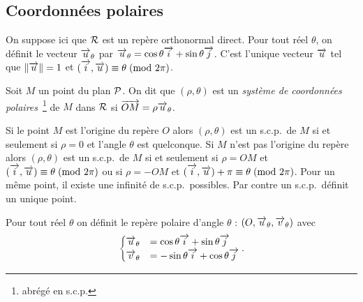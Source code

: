 \subsection{Coordonnées polaires}
\label{subsec:coordpol}
  On suppose ici que \(\Rep\) est un repère orthonormal direct. Pour tout réel \(\theta\), on définit le vecteur \(\vu_\theta\) par \(\vu_\theta=\cos\theta\vi+\sin\theta\vj\). C'est l'unique vecteur \(\vu\) tel que \(\norme{\vu}=1\) et \(\congru{(\vi,\vu)}{\theta}{2\pi}\).
\begin{defdef}
  Soit \(M\) un point du plan \(\P\). On dit que \((\rho,\theta)\) est un \emph{système de coordonnées polaires}~\footnote{abrégé en s.c.p.} de \(M\) dans \(\Rep\) si \(\vect{OM}=\rho\vu_\theta\).
\end{defdef}
%
Si le point \(M\) est l'origine du repère \(O\) alors \((\rho,\theta)\) est un s.c.p.\ de \(M\) si et seulement si \(\rho=0\) et l'angle \(\theta\) est quelconque. Si \(M\) n'est pas l'origine du repère alors \((\rho,\theta)\) est un s.c.p.\ de \(M\) si et seulement si \(\rho=OM\) et \(\congru{(\vi,\vu)}{\theta}{2\pi}\) ou si \(\rho=-OM\) et \(\congru{(\vi,\vu)+\pi}{\theta}{2\pi}\). Pour un même point, il existe une infinité de s.c.p.\ possibles. Par contre un s.c.p.\ définit un unique point.
% 
\begin{defdef}
  Pour tout réel \(\theta\) on définit le repère polaire d'angle \(\theta\) : \((O, \vu_\theta, \vv_\theta)\) avec 
  \begin{equation}
    \begin{cases} 
      \vu_\theta&=\cos \theta \vi + \sin \theta \vj \\ 
      \vv_\theta&=-\sin \theta \vi + \cos \theta \vj
    \end{cases}.
  \end{equation}
\end{defdef}

